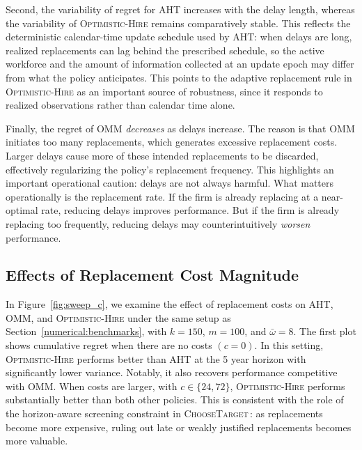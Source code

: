 \documentclass[opre,blindrev]{informs3}
\newcommand{\ChooseTarget}{\textsc{ChooseTarget}\,}
\begin{document}
Second, the variability of regret for \textsc{AHT} increases with the delay length, whereas the variability of \textsc{Optimistic-Hire} remains comparatively stable. This reflects the deterministic calendar-time update schedule used by \textsc{AHT}: when delays are long, realized replacements can lag behind the prescribed schedule, so the active workforce and the amount of information collected at an update epoch may differ from what the policy anticipates. This points to the adaptive replacement rule in \textsc{Optimistic-Hire} as an important source of robustness, since it responds to realized observations rather than calendar time alone.

Finally, the regret of \textsc{OMM} \emph{decreases} as delays increase. The reason is that \textsc{OMM} initiates too many replacements, which generates excessive replacement costs. Larger delays cause more of these intended replacements to be discarded, effectively regularizing the policy's replacement frequency. This highlights an important operational caution: delays are not always harmful. What matters operationally is the replacement rate. If the firm is already replacing at a near-optimal rate, reducing delays improves performance. But if the firm is already replacing too frequently, reducing delays may counterintuitively \emph{worsen} performance.


\subsection{Effects of Replacement Cost Magnitude}\label{numerical:cost}
In Figure~\ref{fig:sweep_c}, we examine the effect of replacement costs on \textsc{AHT}, \textsc{OMM}, and \textsc{Optimistic-Hire} under the same setup as Section~\ref{numerical:benchmarks}, with \(k=150\), \(m=100\), and \(\bar{\omega}=8\). The first plot shows cumulative regret when there are no costs \((c=0)\). In this setting, \textsc{Optimistic-Hire} performs better than \textsc{AHT} at the 5 year horizon with significantly lower variance. Notably, it also recovers performance competitive with \textsc{OMM}. When costs are larger, with \(c\in \{24, 72\}\), \textsc{Optimistic-Hire} performs substantially better than both other policies. This is consistent with the role of the horizon-aware screening constraint in \ChooseTarget: as replacements become more expensive, ruling out late or weakly justified replacements becomes more valuable.
\end{document}
